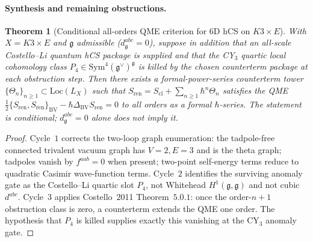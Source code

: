 \documentclass[11pt]{amsart}
\newtheorem{theorem}{Theorem}[section]
\theoremstyle{definition}
\theoremstyle{remark}
\providecommand{\frakg}{\mathfrak{g}}
\providecommand{\Sym}{\mathrm{Sym}}
\providecommand{\Loc}{\mathrm{Loc}}
\providecommand{\BV}{\mathrm{BV}}
\begin{document}
\paragraph{Synthesis and remaining obstructions.}
\begin{theorem}[Conditional all-orders QME criterion for $6$D hCS on $K3 \times E$]
\label{thm:6d-hcs-qme-all-loop-k3xe-blocker6}
With $X = K3 \times E$ and $\frakg$ admissible
\textup{(}$d^{abc}_\frakg = 0$\textup{),} suppose in addition that an
all-scale Costello--Li quantum hCS package is supplied and that the
CY$_3$ quartic local cohomology class
$P_4\in\Sym^4(\frakg^\vee)^\frakg$ is killed by the chosen
counterterm package at each obstruction step. Then there exists a
formal-power-series counterterm tower
$\{\Theta_n\}_{n \geq 1} \subset \Loc(L_X)$ such that
$S_{\mathrm{ren}} = S_{\mathrm{cl}} + \sum_{n \geq 1} \hbar^n \Theta_n$
satisfies the QME
\(\tfrac{1}{2}\{S_{\mathrm{ren}}, S_{\mathrm{ren}}\}_\BV - \hbar
\Delta_\BV S_{\mathrm{ren}} = 0\)
to all orders as a formal $\hbar$-series. The statement is conditional;
$d^{abc}_\frakg=0$ alone does not imply it.
\end{theorem}

\begin{proof}
Cycle~$1$ corrects the two-loop graph enumeration: the tadpole-free
connected trivalent vacuum graph has $V=2,E=3$ and is the theta graph;
tadpoles vanish by $f^{aab}=0$ when present; two-point self-energy
terms reduce to quadratic Casimir wave-function terms. Cycle~$2$
identifies the surviving anomaly gate as the Costello--Li quartic
slot $P_4$, not Whitehead $H^1(\frakg,\frakg)$ and not cubic
$d^{abc}$. Cycle~$3$ applies Costello~2011 Theorem~$5.0.1$: once the
order-$n+1$ obstruction class is zero, a counterterm extends the QME
one order. The hypothesis that $P_4$ is killed supplies exactly this
vanishing at the CY$_3$ anomaly gate.
\end{proof}
\end{document}
